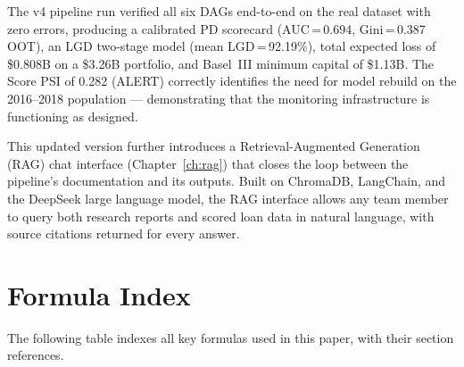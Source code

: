 \documentclass[12pt,a4paper]{report}
\begin{document}
The v4 pipeline run verified all six DAGs end-to-end on the real dataset with zero errors, producing a calibrated PD scorecard (AUC\,=\,0.694, Gini\,=\,0.387 OOT), an LGD two-stage model (mean LGD\,=\,92.19\%), total expected loss of \$0.808B on a \$3.26B portfolio, and Basel~III minimum capital of \$1.13B. The Score PSI of 0.282 (ALERT) correctly identifies the need for model rebuild on the 2016--2018 population --- demonstrating that the monitoring infrastructure is functioning as designed.

This updated version further introduces a Retrieval-Augmented Generation (RAG) chat interface (Chapter~\ref{ch:rag}) that closes the loop between the pipeline's documentation and its outputs. Built on ChromaDB, LangChain, and the DeepSeek large language model, the RAG interface allows any team member to query both research reports and scored loan data in natural language, with source citations returned for every answer.

\chapter*{Formula Index}

The following table indexes all key formulas used in this paper, with their section references.
\end{document}
